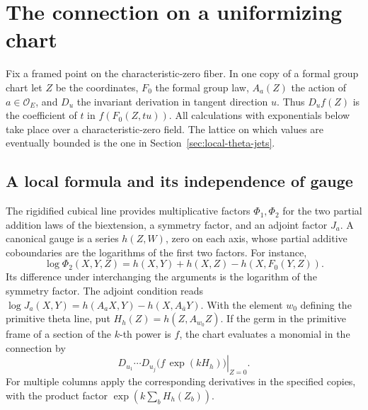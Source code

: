\section{The connection on a uniformizing chart}
\label{sec:jet-connection}

Fix a framed point on the characteristic-zero fiber. In one copy of
a formal group chart let \(Z\) be the coordinates, \(F_0\) the
formal group law, \(A_a(Z)\) the action of \(a\in\mathcal O_E\),
and \(D_u\) the invariant derivation in tangent direction \(u\).
Thus \(D_u f(Z)\) is the coefficient of \(t\) in
\(f(F_0(Z,tu))\). All calculations with exponentials below take
place over a characteristic-zero field. The lattice on which
values are eventually bounded is the one in
Section~\ref{sec:local-theta-jets}.

\subsection{A local formula and its independence of gauge}

The rigidified cubical line provides multiplicative factors
\(\Phi_1,\Phi_2\) for the two partial addition laws of the
biextension, a symmetry factor, and an adjoint factor \(J_a\).
A canonical gauge is a series \(h(Z,W)\), zero on each axis, whose
partial additive coboundaries are the logarithms of the first two
factors. For instance,
\[
 \log\Phi_2(X,Y,Z)=h(X,Y)+h(X,Z)-h(X,F_0(Y,Z)).
\]
Its difference under interchanging the arguments is the logarithm
of the symmetry factor. The adjoint condition reads
\(\log J_a(X,Y)=h(A_aX,Y)-h(X,A_{\bar a}Y)\). With the element
\(w_0\) defining the primitive theta line, put
\(H_h(Z)=h(Z,A_{w_0}Z)\). If the germ in the primitive frame of a
section of the \(k\)-th power is \(f\), the chart evaluates a
monomial in the connection by
\[
      \left.D_{u_1}\cdots D_{u_j}\bigl(f\,\exp(kH_h)\bigr)
      \right|_{Z=0}.
\]
For multiple columns apply the corresponding derivatives in the
specified copies, with the product factor
\(\exp(k\sum_b H_h(Z_b))\).

